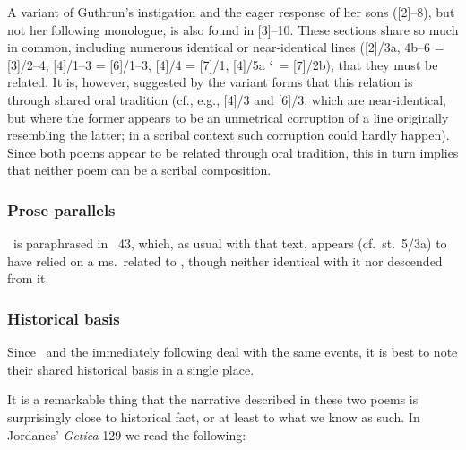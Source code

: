 A variant of Guthrun’s instigation and the eager response of her sons ([2]--8), but not her following monologue, is also found in [3]--10.  These sections share so much in common, including numerous identical or near-identical lines ([2]/3a, 4b--6 = [3]/2--4,
[4]/1--3 = [6]/1--3,
[4]/4 = [7]/1,
[4]/5a \char`~= [7]/2b), that they must be related.  It is, however, suggested by the variant forms that this relation is through shared oral tradition (cf., e.g., [4]/3 and [6]/3, which are near-identical, but where the former appears to be an unmetrical corruption of a line originally resembling the latter; in a scribal context such corruption could hardly happen).  Since both poems appear to be related through oral tradition, this in turn implies that neither poem can be a scribal composition.

\subsubsection{Prose parallels}

\Gudrunarhvot\ is paraphrased in \VolsungaSaga\ 43, which, as usual with that text, appears (cf.~st.~5/3a) to have relied on a ms.~related to \Regius, though neither identical with it nor descended from it.

\subsubsection{Historical basis}

Since \Gudrunarhvot\ and the immediately following  deal with the same events, it is best to note their shared historical basis in a single place.

It is a remarkable thing that the narrative described in these two poems is surprisingly close to historical fact, or at least to what we know as such.  In Jordanes’ \emph{Getica} 129 we read the following:

